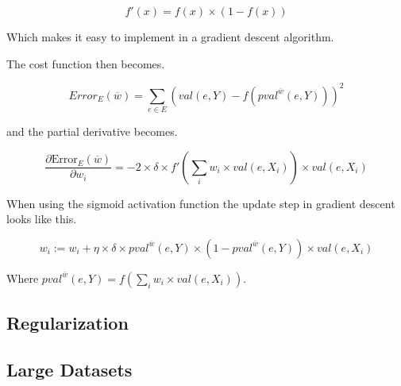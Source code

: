 $$f'(x) = f(x) \times (1-f(x))$$

Which makes it easy to implement in a gradient descent algorithm.

The cost function then becomes.

$$Error_E(\overline{w}) = \sum_{e \in E} (val(e,Y)-f(pval^{\overline{w}}(e,Y)))^2$$ 

and the partial derivative becomes.

$$\frac{\partial \text{Error}_E(\overline{w})}{\partial w_i} 
	= -2 \times \delta \times f'(\sum_i w_i \times val(e,X_i)) \times val(e,X_i)$$

When using the sigmoid activation function the update step in gradient descent looks like this.

$$w_i := w_i + \eta \times \delta \times pval^{\overline{w}}(e,Y) \times (1 - pval^{\overline{w}}(e,Y)) \times val(e,X_i)$$

Where $pval^{\overline{w}}(e,Y) = f(\sum_i w_i \times val(e,X_i))$.  


\begin{flushright}
\cite[p. 306-307]{AI2010}
\end{flushright}


\subsection{Regularization}


\subsection{Large Datasets}












